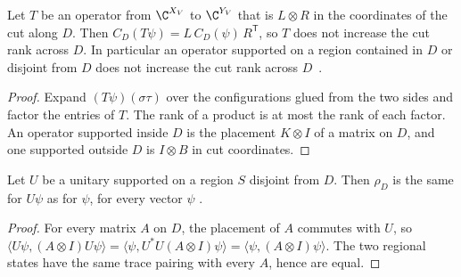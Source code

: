 \begin{theorem}
    \label{thm:sites_cut_rank_local}
    \leanok
    Let $T$ be an operator from $\C^{X_V}$ to $\C^{Y_V}$ that is $L\otimes R$ in the
    coordinates of the cut along $D$. Then $C_D(T\psi)=L\,C_D(\psi)\,R^{\mathsf T}$,
    so $T$ does not increase the cut rank across $D$. In particular an operator supported
    on a region contained in $D$ or disjoint from $D$ does not increase the cut rank
    across $D$~\cite[Corollary~6.10]{Schuch2010PEPS}.
\end{theorem}
\begin{proof}\leanok
    Expand $(T\psi)(\sigma\tau)$ over the configurations glued from the two sides and
    factor the entries of $T$. The rank of a product is at most the rank of each factor.
    An operator supported inside $D$ is the placement $K\otimes I$ of a matrix on $D$,
    and one supported outside $D$ is $I\otimes B$ in cut coordinates.
\end{proof}

\begin{theorem}
    \label{thm:sites-regional-unitary}
    \leanok
    Let $U$ be a unitary supported on a region $S$ disjoint from $D$. Then
    $\rho_D$ is the same for $U\psi$ as for $\psi$, for every vector $\psi$
    \cite[Section~10]{OpenAI2026AreaLaw}.
\end{theorem}
\begin{proof}
    \leanok
    For every matrix $A$ on $D$, the placement of $A$ commutes with $U$, so
    $\langle U\psi,(A\otimes I)U\psi\rangle
    =\langle\psi,U^*U(A\otimes I)\psi\rangle
    =\langle\psi,(A\otimes I)\psi\rangle$. The two regional states have the same
    trace pairing with every $A$, hence are equal.
\end{proof}

